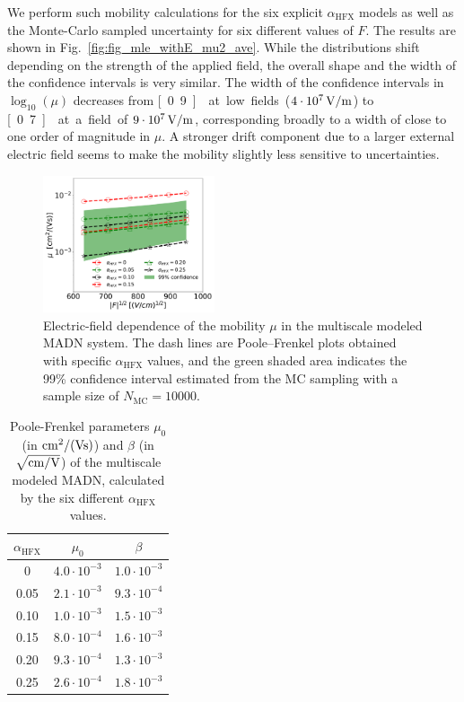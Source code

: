 \documentclass[%
 reprint,
superscriptaddress,
 amsmath,amssymb,
 aps,
prb,
floatfix
]{revtex4-2}
\newcommand{\ahfx}{\ensuremath{\alpha_\text{HFX}}\xspace}
\begin{document}
We perform such mobility calculations for the six explicit \ahfx models as well as the Monte-Carlo sampled uncertainty for six different values of $F$. The results are shown in Fig.~\ref{fig:fig_mle_withE_mu2_ave}. While the distributions shift depending on the strength of the applied field, the overall shape and the width of the confidence intervals is very similar. The width of the confidence intervals in $\log_{10}(\mu)$ decreases from \unit[0.9]{} at low fields ($\unit[4 \cdot 10^7]{V/m}$) to \unit[0.7]{} at a field of $\unit[9 \cdot 10^7]{V/m}$, corresponding broadly to a width of close to one order of magnitude in $\mu$. A stronger drift component due to a larger external electric field seems to make the mobility slightly less sensitive to uncertainties. 

\begin{figure}[tbp]
    \centering
    \includegraphics[width=0.45\textwidth]{fig8.pdf}
    \caption{Electric-field dependence of the mobility $\mu$ in the multiscale modeled MADN system. The dash lines are Poole--Frenkel plots obtained with specific \ahfx values, and the green shaded area indicates the 99\% confidence interval estimated from the MC sampling with a sample size of $N_\text{MC}=10000$.}
    \label{fig:PF_plot_ave}
\end{figure}


\begin{table}[tbp]
  \caption{\label{tab:PF_parameter}%
  Poole-Frenkel parameters $\mu_0$ (in $\unit[]{cm^2/(Vs)}$) and $\beta$ (in $\unit[]{\sqrt{cm/V}}$) of the multiscale modeled MADN, calculated by the six different \ahfx values. 
  }
  \begin{ruledtabular}
    \begin{tabular}{c c c}
    $\ahfx$ & $\mu_0$  & $\beta$ \\
      \hline
    0 & $4.0 \cdot 10^{-3}$ & $1.0 \cdot 10^{-3}$ \\
    0.05 & $2.1 \cdot 10^{-3}$ & $9.3 \cdot 10^{-4}$ \\
    0.10 & $1.0 \cdot 10^{-3}$ & $1.5 \cdot 10^{-3}$ \\
    0.15 & $8.0 \cdot 10^{-4}$ & $1.6 \cdot 10^{-3}$ \\
    0.20 & $9.3 \cdot 10^{-4}$ & $1.3 \cdot 10^{-3}$ \\
    0.25 & $2.6 \cdot 10^{-4}$ & $1.8 \cdot 10^{-3}$ \\
      \end{tabular}
  \end{ruledtabular}
  \end{table}
\end{document}
